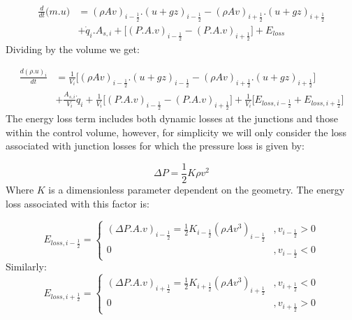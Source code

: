 \documentclass[11pt,letterpaper,titlepage]{article}
\newcommand{\half}{\frac{1}{2}}
\begin{document}
\begin{equation*}
\begin{aligned}
\frac{d}{dt} \biggr( m.u \biggr)&=(\rho Av)_{i-\half}.(u+gz)_{i-\half} - (\rho Av)_{i+\half}.(u+gz)_{i+\half} \\
&+\dot{q}_i.A_{s,i} + \biggr[   (P.A.v)_{i-\half} - (P.A.v)_{i+\half}   \biggr] + E_{loss}
\end{aligned}
\end{equation*}
\newline
\noindent
Dividing by the volume we get:

\begin{equation}
\begin{aligned}
\frac{d(\rho.u)_i}{dt} &=\frac{1}{V_i}\biggr[ (\rho Av)_{i-\half}.(u+gz)_{i-\half} - (\rho Av)_{i+\half}.(u+gz)_{i+\half} \biggr] \\
&+\frac{A_{s,i}}{V_i}\dot{q}_i + \frac{1}{V_i}\biggr[   (P.A.v)_{i-\half} - (P.A.v)_{i+\half}   \biggr] + \frac{1}{V_i}\biggr[  E_{loss,i-\half} +E_{loss,i+\half}   \biggr]
\end{aligned}
\end{equation}
\newline
\noindent The energy loss term includes both dynamic losses at the junctions and those within the control volume, however, for simplicity we will only consider the loss associated with junction losses for which the pressure loss is given by:

\begin{equation*}
\Delta P = \half K \rho  v^2
\end{equation*}
\newline
\noindent Where $K$ is a dimensionless parameter dependent on the geometry. The energy loss associated with this factor is:

\begin{equation*}
E_{loss,i-\half}=
\begin{cases}
(\Delta P.A.v)_{i-\half} = \half  K_{i-\half} (\rho A v^3)_{i-\half}     &,v_{i-\half}>0 \\
0    &,v_{i-\half}<0
\end{cases}
\end{equation*}
\newline
\noindent Similarly:
\begin{equation*}
E_{loss,i+\half}=
\begin{cases}
(\Delta P.A.v)_{i+\half} = \half  K_{i+\half} (\rho A v^3)_{i+\half}     &,v_{i+\half}<0 \\
0    &,v_{i+\half}>0
\end{cases}
\end{equation*}
\end{document}
